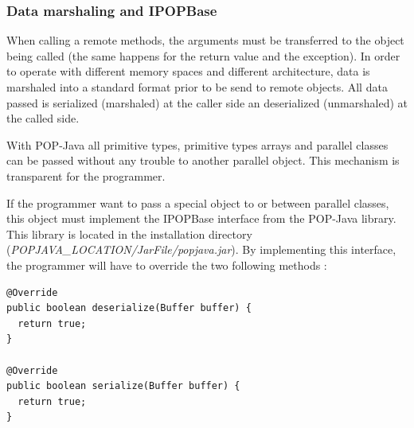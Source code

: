 \subsubsection{Data marshaling and IPOPBase}
When calling a remote methods, the arguments must be transferred to the object being called (the same happens for the return value and the exception).  In order to operate with different memory spaces and different architecture, data is marshaled into a standard format prior to be send to remote objects. All data passed is serialized (marshaled) at the caller side an deserialized (unmarshaled) at the called side. \s

With POP-Java all primitive types, primitive types arrays and parallel classes can be passed without any trouble to another parallel object. This mechanism is transparent for the programmer.\s

If the programmer want to pass a special object to or between parallel classes, this object must implement the IPOPBase interface from the POP-Java library. This library is located in the installation directory (\textit{POPJAVA\_LOCATION/JarFile/popjava.jar}). By implementing this interface, the programmer will have to override the two following methods : 

\begin{lstlisting}
@Override
public boolean deserialize(Buffer buffer) {
  return true;
}

@Override
public boolean serialize(Buffer buffer) {
  return true;
}
\end{lstlisting}\s

